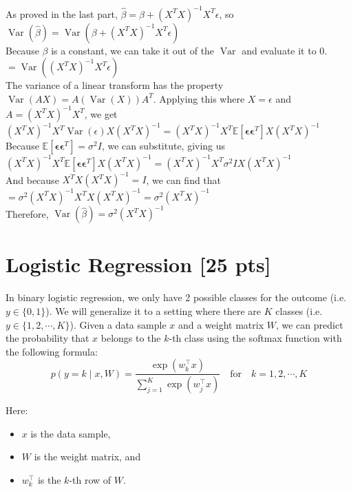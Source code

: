 \documentclass[11pt]{article}
\DeclareMathOperator{\Var}{Var}
\begin{document}
\begin{enumerate}
\begin{answertext}{9cm}{}
As proved in the last part, $\hat{\beta} = \beta + (X^TX)^{-1}X^T\epsilon$, so\\
$\Var(\hat{\beta}) = \Var(\beta + (X^TX)^{-1}X^T\epsilon)$\\
Because $\beta$ is a constant, we can take it out of the $\Var$ and evaluate it to $0$.\\
$= \Var((X^TX)^{-1}X^T\epsilon)$\\
The variance of a linear transform has the property $\Var(AX) = A(\Var(X))A^T$. Applying this where $X = \epsilon$ and $A = (X^TX)^{-1}X^T$, we get\\
$(X^TX)^{-1}X^T\Var(\epsilon)X(X^TX)^{-1} = (X^TX)^{-1}X^T\mathbb{E}\left[\boldsymbol{\epsilon} \boldsymbol{\epsilon}^T\right]X(X^TX)^{-1}$\\
Because $\mathbb{E}\left[\boldsymbol{\epsilon} \boldsymbol{\epsilon}^T\right]=\sigma^2 I$, we can substitute, giving us\\
$(X^TX)^{-1}X^T\mathbb{E}\left[\boldsymbol{\epsilon} \boldsymbol{\epsilon}^T\right]X(X^TX)^{-1} = (X^TX)^{-1}X^T\sigma^2 IX(X^TX)^{-1}$\\
And because $X^TX(X^TX)^{-1} = I$, we can find that\\
$= \sigma^2(X^TX)^{-1}X^TX(X^TX)^{-1} = \sigma^2(X^TX)^{-1}$\\
Therefore, $\Var(\hat{\beta}) = \sigma^2(X^TX)^{-1}$

\end{answertext} 




\end{enumerate}

\pagebreak
\section{Logistic Regression [25 pts]}
In binary logistic regression, we only have 2 possible classes for the outcome (i.e. $y\in\{0,1\}$). We will generalize it to a setting where there are $K$ classes (i.e. $y\in\{1,2,\cdots,K\}$). Given a data sample $x$ and a weight matrix $W$, we can predict the probability that $x$ belongs to the $k$-th class using the softmax function with the following formula:
\[
p(y=k\mid x,W)=\frac{\exp(w_k^\top x)}{\sum_{j=1}^K\exp(w_j^\top x)}\quad\text{for}\quad k=1,2,\cdots,K
\]

Here:
\begin{itemize}
    \item $x$ is the data sample,
    \item $W$ is the weight matrix, and
    \item $w_k^\top$ is the $k$-th row of $W$.
\end{itemize}
\end{document}
